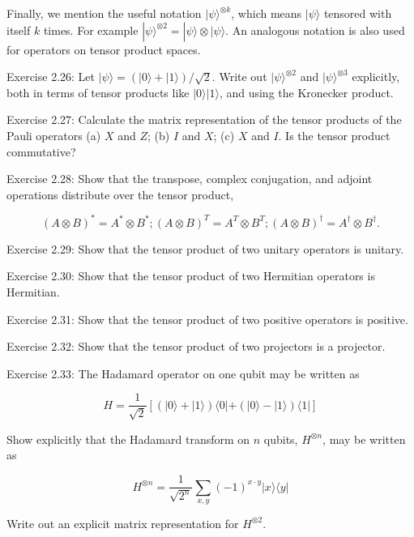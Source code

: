 Finally, we mention the useful notation $|\psi\rangle^{\otimes k}$, which means $|\psi\rangle$ tensored with itself $k$ times. For example $|\psi\rangle^{\otimes 2}=|\psi\rangle \otimes|\psi\rangle$. An analogous notation is also used for operators on tensor product spaces.

Exercise 2.26: Let $|\psi\rangle=(|0\rangle+|1\rangle) / \sqrt{2}$. Write out $|\psi\rangle^{\otimes 2}$ and $|\psi\rangle^{\otimes 3}$ explicitly, both in terms of tensor products like $|0\rangle|1\rangle$, and using the Kronecker product.

Exercise 2.27: Calculate the matrix representation of the tensor products of the Pauli operators (a) $X$ and $Z$; (b) $I$ and $X$; (c) $X$ and $I$. Is the tensor product commutative?

Exercise 2.28: Show that the transpose, complex conjugation, and adjoint operations distribute over the tensor product,

$$
(A \otimes B)^{*}=A^{*} \otimes B^{*} ;(A \otimes B)^{T}=A^{T} \otimes B^{T} ;(A \otimes B)^{\dagger}=A^{\dagger} \otimes B^{\dagger} .
$$

Exercise 2.29: Show that the tensor product of two unitary operators is unitary.

Exercise 2.30: Show that the tensor product of two Hermitian operators is Hermitian.

Exercise 2.31: Show that the tensor product of two positive operators is positive.

Exercise 2.32: Show that the tensor product of two projectors is a projector.

Exercise 2.33: The Hadamard operator on one qubit may be written as

$$
H=\frac{1}{\sqrt{2}}[(|0\rangle+|1\rangle)\langle 0|+(|0\rangle-|1\rangle)\langle 1|]
$$

Show explicitly that the Hadamard transform on $n$ qubits, $H^{\otimes n}$, may be written as

$$
H^{\otimes n}=\frac{1}{\sqrt{2^{n}}} \sum_{x, y}(-1)^{x \cdot y}|x\rangle\langle y|
$$

Write out an explicit matrix representation for $H^{\otimes 2}$.